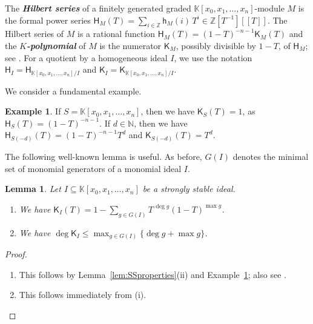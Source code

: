 \documentclass[12pt]{amsart}%
\newtheorem{lemma}[theorem]{Lemma}
\theoremstyle{definition}%
\newtheorem{example}[theorem]{Example}
\newcommand{\hf}{\mathsf{h}}%
\newcommand{\hs}{\mathsf{H}}%
\newcommand{\hk}{\mathsf{K}}%
\newcommand{\kk}{\mathbb{K}}%
\newcommand{\NN}{\mathbb{N}}%
\newcommand{\ZZ}{\mathbb{Z}}%
\begin{document}
The \emph{\bfseries Hilbert series} of a finitely generated graded
$\kk[x_0, x_1, \dotsc, x_n]$-module $M$ is the formal power series
$\hs_M( T ) = \sum_{i \in \ZZ} \hf_{M}(i) \, T^i \in \ZZ[T^{-1}][\![ T
  ]\!]$.  The Hilbert series of $M$ is a rational function $\hs_M( T )
= (1-T)^{-n-1} \hk_M( T )$ and the \emph{\bfseries $K$-polynomial} of
$M$ is the numerator $\hk_M$, possibly divisible by $1-T$, of $\hs_M$;
see \cite[Theorem~8.20]{Miller--Sturmfels--2005}.  For a quotient by a
homogeneous ideal $I$, we use the notation $\hs_I = \hs_{\kk[x_0, x_1,
    \dotsc, x_n]/I}$ and $\hk_I = \hk_{\kk[x_0, x_1, \dotsc, x_n]/I}$.

We consider a fundamental example.

\begin{example}%
  \label{eg:Kpoly}
  If $S = \kk[x_0, x_1, \dotsc, x_n]$, then we have $\hk_{S}(T) = 1$,
  as $\hs_{S}(T) = (1 - T)^{-n-1}$.  If $d \in \NN$, then we have
  $\hs_{S(-d)}(T) = (1 - T)^{-n-1} T^d$ and $\hk_{S(-d)}(T) = T^d$.
\end{example}

The following well-known lemma is useful.  As before, $G(I)$ denotes
the minimal set of monomial generators of a monomial ideal $I$.

\begin{lemma}
  \label{lem:Kpolydefbnd}
  Let $I \subseteq \kk[x_0, x_1, \dotsc, x_n]$ be a strongly stable
  ideal.
  \begin{enumerate}
  \item We have $\hk_{I}(T) = 1 - \sum_{g \in G(I)} T^{\, \deg g} (1 -
    T)^{\max g}$.
    
  \item We have $\deg \hk_{I} \le \max_{g \in G(I)} \bigl\{ \deg g +
    \max g \bigr\}$.
  \end{enumerate}
\end{lemma}

\begin{proof} $\;$
  \begin{enumerate}
  \item This follows by Lemma~\ref{lem:SSproperties}(ii) and
    Example~\ref{eg:Kpoly}; also see
    \cite[Proposition~2.12]{Miller--Sturmfels--2005}.
  
  \item This follows immediately from (i).  \qedhere
  \end{enumerate}
\end{proof}
\end{document}

